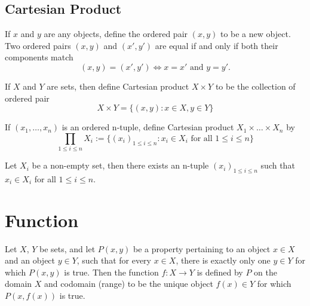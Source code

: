 \documentclass{blog}
\begin{document}
\subsection{Cartesian Product}
\begin{definition}
  If $x$ and $y$ are any objects,
  define the ordered pair $(x,y)$ to be a new object.
  Two ordered pairs $(x,y)$ and $(x',y')$ are equal if and only if both their components match
  \begin{equation}
    (x,y) = (x',y') \Longleftrightarrow \text{$x = x'$ and $y = y'$.}
  \end{equation}
\end{definition}

\begin{definition}
  If $X$ and $Y$ are sets, then define Cartesian product $X \times Y$ to be the collection of ordered pair
  \begin{equation}
    X \times Y = \{(x,y): x \in X, y \in Y\}
  \end{equation}
\end{definition}

\begin{definition}
  If $(x_{1},\dots,x_{n})$ is an ordered n-tuple,
  define Cartesian product $X_{1} \times \dots \times X_{n}$ by
  \begin{equation}
    \prod_{1 \leq i \leq n}X_{i} :=
    \{(x_{i})_{1 \leq i \leq n}: x_{i} \in X_{i} \text{ for all } 1 \leq i \leq n\}
  \end{equation}
\end{definition}

\begin{lemma}
  Let $X_{i}$ be a non-empty set, then there exists an n-tuple $(x_{i})_{1 \leq i \leq n}$
  such that $x_{i} \in X_{i}$ for all $1 \leq i \leq n$.
\end{lemma}

\section{Function}
\begin{definition}[function]
  Let $X$, $Y$ be sets, and let $P(x,y)$ be a property pertaining to
  an object $x \in X$ and an object $y \in Y$, such that
  for every $x \in X$, there is exactly only one $y \in Y$ for which
  $P(x,y)$ is true.
  Then the function $f: X \to Y$ is defined by $P$ on the domain $X$ and codomain (range)
  to be the unique object $f(x) \in Y$ for which $P(x,f(x))$ is true.
\end{definition}
\end{document}
